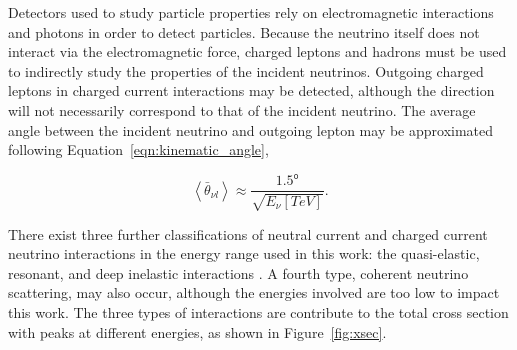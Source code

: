 Detectors used to study particle properties rely on electromagnetic interactions and photons in order to detect particles.
Because the neutrino itself does not interact via the electromagnetic force, charged leptons and hadrons must be used to indirectly study the properties of the incident neutrinos.
Outgoing charged leptons in charged current interactions may be detected, although the direction will not necessarily correspond to that of the incident neutrino. 
The average angle between the incident neutrino and outgoing lepton may be approximated following Equation~\ref{eqn:kinematic_angle},

\begin{equation}
\left<\bar{\theta}_{\nu l}\right> \approx \frac{\mathtt{1.5^o}}{\sqrt{E_\nu \left[TeV\right]}} .
\label{eqn:kinematic_angle}
\end{equation}

There exist three further classifications of neutral current and charged current neutrino interactions in the energy range used in this work: the quasi-elastic, resonant, and deep inelastic interactions \cite{Formaggio-Xsec}.
A fourth type, coherent neutrino scattering, may also occur, although the energies involved are too low to impact this work.
The three types of interactions are contribute to the total cross section with peaks at different energies, as shown in Figure~\ref{fig:xsec}.

